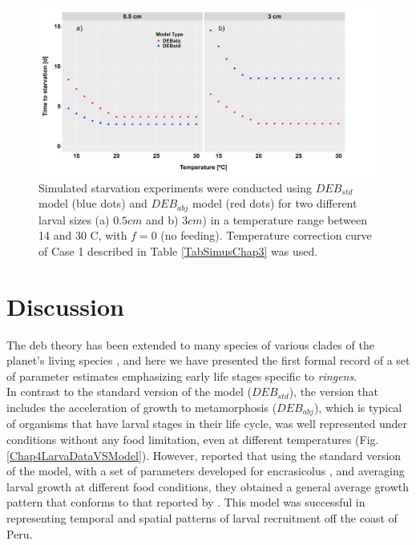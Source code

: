 \begin{figure}[ht]
	\includegraphics[width=1.0\textwidth]{figures/Chap4t_starvation_f0_V2cTcase1.png}
	\centering
	\caption{Simulated starvation experiments were conducted using $DEB_{std}$ model (blue dots) and $DEB_{abj}$ model (red dots) for two different larval sizes (a) $0.5 cm$ and b) $3 cm$) in a temperature range between 14 and 30 \textdegree C, with $f = 0$ (no feeding). Temperature correction curve of Case 1 described in Table \ref{TabSimusChap3} was used.}
	\label{Chap4t_starvation_f0_V2cTcase1}
\end{figure}

\clearpage
\section{Discussion}

The \acrfull{deb} theory has been extended to many species of various clades of the planet's living species \citep{Kooi2009}, and here we have presented the first formal record of a set of parameter estimates emphasizing early life stages specific to \textit{\gls{ringens}}.\\

In contrast to the standard version of the model ($DEB_{std}$), the version that includes the acceleration of growth to metamorphosis ($DEB_{abj}$), which is typical of organisms that have larval stages in their life cycle, was well represented under conditions without any food limitation, even at different temperatures (Fig. \ref{Chap4LarvaDataVSModel}). However, \cite{FlorLett2023} reported that using the standard version of the model, with a set of parameters developed for \gls{encrasicolus} \citep{PethRoos2013}, and averaging larval growth at different food conditions, they obtained a general average growth pattern that conforms to that reported by \cite{RiouOfel2021}. This model was successful in representing temporal and spatial patterns of larval recruitment off the coast of Peru.\\

